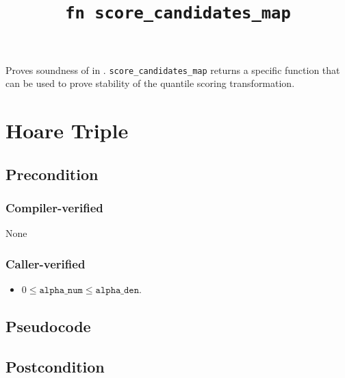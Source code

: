 \documentclass{article}
\title{\texttt{fn score\_candidates\_map}}
\author{\MichaelShoemateAuthor}
\begin{document}
\maketitle


\contrib

Proves soundness of 
in .
\texttt{score\_candidates\_map} returns a specific function that can be used to prove stability of the quantile scoring transformation.

\section{Hoare Triple}
\subsection*{Precondition}
\subsubsection*{Compiler-verified}
None

\subsubsection*{Caller-verified}
\begin{itemize}
    \item $0 \leq \texttt{alpha\_num} \leq \texttt{alpha\_den}$.
\end{itemize}

\subsection*{Pseudocode}
\label{sec:python-pseudocode}



\subsection*{Postcondition}
\end{document}
